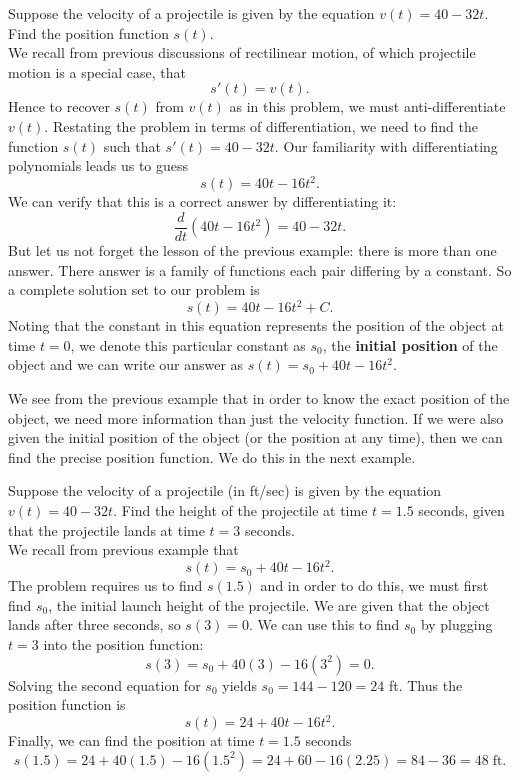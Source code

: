 \documentclass[handout]{ximera}
\begin{document}
\begin{example}[example 2]
Suppose the velocity of a projectile is given by the equation $v(t) = 40 - 32t$. Find the position function $s(t)$.\\
We recall from previous discussions of rectilinear motion, of which projectile motion is a special case, that
\[
s'(t) = v(t).
\]
Hence to recover $s(t)$ from $v(t)$ as in this problem, we must anti-differentiate $v(t)$.
Restating the problem in terms of differentiation, we need to find the function $s(t)$ such that $s'(t) = 40 - 32t$.
Our familiarity with differentiating polynomials leads us to guess
\[
s(t) = 40t - 16t^2.
\]
We can verify that this is a correct answer by differentiating it:
\[
\frac{d}{dt}\left(40t - 16t^2\right) = 40 - 32t.
\]
But let us not forget the lesson of the previous example: there is more than one answer.  There answer is a family of functions
each pair differing by a constant. So a complete solution set to our problem is
\[
s(t) = 40t - 16t^2 + C.
\]
Noting that the constant in this equation represents the position of the object at time $t = 0$,
we denote this particular constant as $s_0$, the \textbf{initial position} of the object and we can write our answer as 
$s(t) = s_0 + 40t - 16t^2$.


\end{example}






We see from the previous example that in order to know the exact position of the object, 
we need more information than just the velocity function.
If we were also given the initial position of the object (or the position at any time), 
then we can find the precise position function.
We do this in the next example.

\begin{example}[example 3]
Suppose the velocity of a projectile (in ft/sec) is given by the equation $v(t) = 40 - 32t$. 
Find the height of the projectile at time $t = 1.5$ seconds, 
given that the projectile lands at time $t = 3$ seconds. \\

We recall from previous example that 
\[
s(t) = s_0 + 40t - 16t^2.
\]
The problem requires us to find $s(1.5)$ and in order to do this, we must first find $s_0$, 
the initial launch height of the projectile.
We are given that the object lands after three seconds, so $s(3) = 0$. We can use this to find $s_0$
by plugging $t=3$ into the position function:
\[
s(3) = s_0 + 40(3) - 16(3^2) = 0.
\]
Solving the second equation for $s_0$ yields $s_0 = 144 - 120 = 24$ ft.
Thus the position function is
\[
s(t) = 24 + 40t - 16t^2.
\]
Finally, we can find the position at time $t=1.5$ seconds
\[
s(1.5) = 24 + 40(1.5) - 16(1.5^2) = 24 + 60 - 16(2.25) = 84 - 36 = 48 \; \text{ft}.
\]
\end{example}
\end{document}

